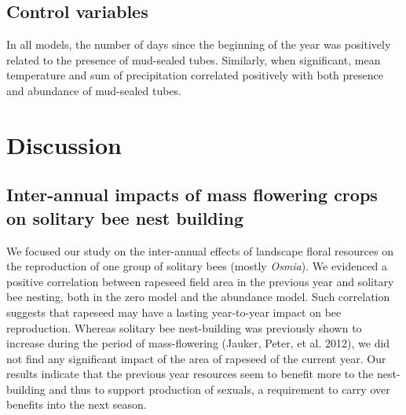 \documentclass[smallextended]{svjour3}       %
\begin{document}
\hypertarget{control-variables-1}{%
\subsection{Control variables}\label{control-variables-1}}

In all models, the number of days since the beginning of the year was
positively related to the presence of mud-sealed tubes. Similarly, when
significant, mean temperature and sum of precipitation correlated
positively with both presence and abundance of mud-sealed tubes.

\hypertarget{discussion}{%
\section{Discussion}\label{discussion}}

\hypertarget{inter-annual-impacts-of-mass-flowering-crops-on-solitary-bee-nest-building}{%
\subsection{Inter-annual impacts of mass flowering crops on solitary bee
nest
building}\label{inter-annual-impacts-of-mass-flowering-crops-on-solitary-bee-nest-building}}

We focused our study on the inter-annual effects of landscape floral
resources on the reproduction of one group of solitary bees (mostly
\emph{Osmia}). We evidenced a positive correlation between rapeseed
field area in the previous year and solitary bee nesting, both in the
zero model and the abundance model. Such correlation suggests that
rapeseed may have a lasting year-to-year impact on bee reproduction.
Whereas solitary bee nest-building was previously shown to increase
during the period of mass-flowering (Jauker, Peter, et al. 2012), we did
not find any significant impact of the area of rapeseed of the current
year. Our results indicate that the previous year resources seem to
benefit more to the nest-building and thus to support production of
sexuals, a requirement to carry over benefits into the next season.
\end{document}
